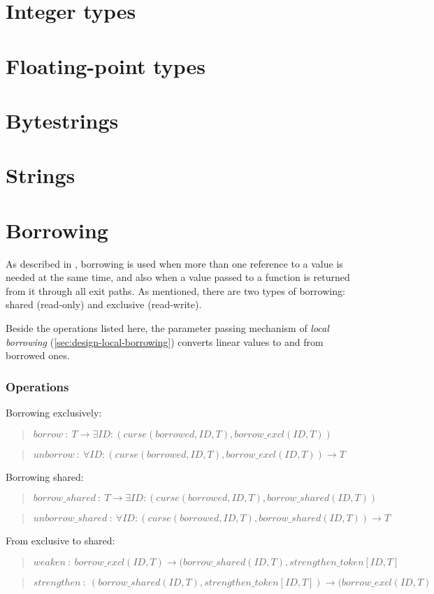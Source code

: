 \documentclass[a4paper]{book}
\newcommand\FuncSignature[2]{\begin{quote}$\mathit{#1}\ :\ \mathit{#2}$\end{quote}}
\begin{document}
\chapter{Integer types}
\chapter{Floating-point types}
\chapter{Bytestrings}





\chapter{Strings}
\chapter{Borrowing}
As described in , borrowing is used when
more than one reference to a value is needed at the same time, and also
when a value passed to a function is returned from it through all exit paths.
As mentioned, there are two types of borrowing: shared (read-only) and
exclusive (read-write).

Beside the operations listed here, the parameter passing mechanism of
\emph{local borrowing} (\ref{sec:design-local-borrowing})
converts linear values to and from borrowed ones.

\subsection*{Operations}
Borrowing exclusively:

\FuncSignature{borrow}{T \to \exists ID: (curse(borrowed, ID, T), borrow\_excl(ID, T))}
\FuncSignature{unborrow}{\forall ID: (curse(borrowed, ID, T), borrow\_excl(ID, T)) \to T}

\noindent
Borrowing shared:

\FuncSignature{borrow\_shared}{T \to \exists ID: (curse(borrowed, ID, T), borrow\_shared(ID, T))}
\FuncSignature{unborrow\_shared}{\forall ID: (curse(borrowed, ID, T), borrow\_shared(ID, T)) \to T}

\noindent
From exclusive to shared:

\FuncSignature{weaken}{borrow\_excl(ID, T) \to (borrow\_shared(ID, T), strengthen\_token[ID,T]}
\FuncSignature{strengthen}{(borrow\_shared(ID, T), strengthen\_token[ID,T]) \to (borrow\_excl(ID, T)}
\end{document}
